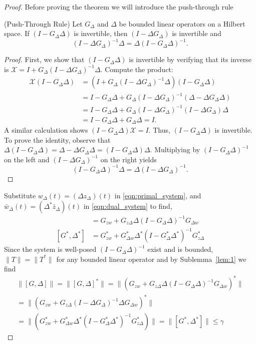 \begin{proof}
Before proving the theorem we will introduce the push-through rule
\begin{sublemma}\label{lem:1} (Push-Through Rule)
Let \( G_\Delta \) and \( \Delta \) be bounded linear operators on a Hilbert
space. If \( (I - G_\Delta \Delta) \) is invertible, then \( (I - \Delta
G_\Delta) \) is invertible and
\[
(I - \Delta G_\Delta)^{-1} \Delta = \Delta (I - G_\Delta \Delta)^{-1}.
\]
\end{sublemma}
\begin{proof}
First, we show that \( (I - G_\Delta \Delta) \) is invertible by verifying that
its inverse is \( \mathcal{X} = I + G_\Delta (I - \Delta G_\Delta)^{-1} \Delta
\). Compute the product:
\begin{align*}
\mathcal{X} (I - G_\Delta \Delta) & = \left(I + G_\Delta (I - \Delta
G_\Delta)^{-1} \Delta \right) (I - G_\Delta \Delta)           \\
& = I - G_\Delta \Delta + G_\Delta (I - \Delta G_\Delta)^{-1} (\Delta - \Delta
G_\Delta  \Delta) \\
& = I - G_\Delta \Delta + G_\Delta (I - \Delta G_\Delta)^{-1} (I - \Delta
G_\Delta) \Delta       \\
& = I - G_\Delta \Delta + G_\Delta \Delta = I.
\end{align*}
A similar calculation shows \( (I - G_\Delta \Delta) \mathcal{X} = I \). Thus,
\( (I - G_\Delta \Delta) \) is invertible. To prove the identity, observe that
\( \Delta (I - G_\Delta \Delta) = \Delta - \Delta G_\Delta \Delta = (I -
G_\Delta \Delta) \Delta \). Multiplying by \( (I - G_\Delta \Delta)^{-1} \) on
the left and \( (I - \Delta G_\Delta)^{-1} \) on the right yields
\[
(I - G_\Delta \Delta)^{-1} \Delta = \Delta (I - \Delta G_\Delta)^{-1}.
\]
\end{proof}
Substitute $w_\Delta(t) = (\Delta z_\Delta)(t)$ in \eqref{eqn:primal_system},
and $\bar{w}_\Delta(t) = (\Delta^* \bar{z}_\Delta)(t)$ in
\eqref{eqn:dual_system} to find,
\begin{align*}
[G,\Delta]                & = G_{zw} +
G_{z\Delta}\Delta(I-G_\Delta\Delta)^{-1}G_{\Delta w}             \\
[G^*, \Delta^*] & = G_{zw}^* + G_{\Delta
w}^*\Delta^*(I-G_\Delta^*\Delta^*)^{-1}G_{z\Delta}^*
\end{align*}
\color{orange}Since the system is well-posed $(I-G_\Delta\Delta)^{-1}$ exist and
is bounded, \color{black}$\|T\| = \|T^*\|$ for any bounded linear operator
\cite[Thm 3.9]{kreyszig1991introductory} and by Sublemma~\ref{lem:1} we find
\begin{gather*}
\|[G,\Delta]\| = \|[G,\Delta]^*\|= \|(G_{zw} +
G_{z\Delta}\Delta(I-G_\Delta\Delta)^{-1}G_{\Delta w})^*\| \\=
\|(G_{zw} + G_{z\Delta}(I-\Delta G_\Delta)^{-1}\Delta G_{\Delta w})^*\|\\=
\|(G_{zw}^* + G_{\Delta w}^*\Delta^*(I-G_\Delta^*\Delta^*)^{-1}G_{z\Delta}^*)\|
= \|[G^*,\Delta^*]\|\leq\gamma
\end{gather*}
\end{proof}